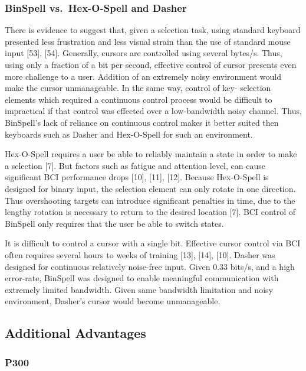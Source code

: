 \documentclass[12pt,titlepage]{article}
\begin{document}
\subsubsection{BinSpell vs.\ Hex-O-Spell and Dasher}

There is evidence to suggest that, given a selection task, using standard keyboard  presented 
less frustration and less visual strain than the use of standard mouse input [53], [54].  Generally, 
cursors are controlled using several bytes/s.  Thus, using only a fraction of a bit per second, 
effective control of cursor presents even more challenge to a user.  Addition of an extremely 
noisy environment would make the cursor unmanageable.  In the same way, control of key- 
selection elements which required a continuous control process would be difficult to 
impractical if that control was effected over a low-bandwidth noisy channel.  Thus, BinSpell's 
lack of reliance on continuous control makes it better suited then keyboards such as Dasher and 
Hex-O-Spell for such an environment.

Hex-O-Spell requires a user be able to reliably maintain a state in order to make a selection [7]. 
But factors such as fatigue and attention level, can cause significant BCI performance 
drops [10], [11], [12].  Because Hex-O-Spell is designed for binary input, the selection element 
can only rotate in one direction.  Thus overshooting targets can introduce significant penalties 
in time, due to the  lengthy rotation is necessary to return to the desired location [7].  BCI 
control of BinSpell only requires that the user be able to switch states.

It is difficult to control a cursor with a single bit.  Effective cursor control via BCI often 
requires several hours to weeks of training [13], [14], [10].  Dasher was designed for continuous
relatively noise-free input.  Given $0.33$ bits/s, and a high error-rate,  BinSpell was designed to 
enable meaningful communication with extremely limited bandwidth.  Given same bandwidth 
limitation and noisy environment, Dasher's cursor would become unmanageable.

\subsection{Additional Advantages}

\subsubsection{P300}
\end{document}
